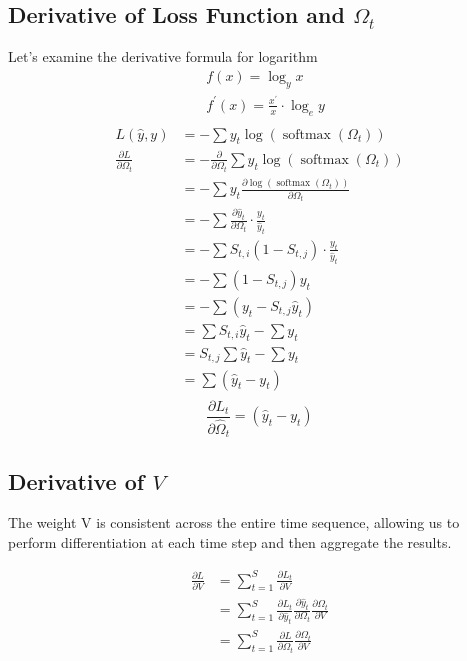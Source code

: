 \documentclass{article}
\begin{document}
\subsection{Derivative of Loss Function and $\Omega_t$}
Let's examine the derivative formula for logarithm
\begin{align*}
    & f(x)=\log _{y} x \\
& f^{\prime}(x)=\frac{x^{\prime}}{x} \cdot \log _{e} y\\
\end{align*}
\begin{align*}
    L(\hat{y}, y) &=-\sum y_{t} \log \left(\operatorname{softmax}\left(\Omega_{t}\right)\right)\\
    \frac{\partial L}{\partial \Omega_{t}} & =-\frac{\partial}{\partial \Omega_{t}} \sum y_{t} \log \left(\operatorname{softmax}\left(\Omega_{t}\right)\right) \\
&=-\sum y_{t} \frac{\partial \log \left(\operatorname{softmax}\left(\Omega_{t}\right)\right)}{\partial \Omega_{t}}  \\
& =-\sum \frac{\partial \hat{y}_t}{\partial \Omega_{t}} \cdot \frac{y_{t}}{\hat{y}_{t}} \\
& =-\sum S_{t,i}\left(1-S_{t,j}\right) \cdot \frac{y_{t}}{\hat{y}_{t}} \\
& =-\sum\left(1-S_{t,j}\right) y_{t} \\
& =-\sum\left(y_{t}-S_{t,j} \hat{y}_{t}\right) \\
& =\sum S_{t,i} \hat{y}_{t}-\sum y_{t} \\
& =S_{t,j} \sum \hat{y}_{t}-\sum y_{t} \\
& =\sum (\hat{y}_{t}-y_{t}) \\
\end{align*}
\begin{equation}
\label{eqn:partial_omega}
    \frac{\partial L_t}{\partial \hat{\Omega}_t} = (\hat{y}_{t}-y_{t})
\end{equation}
\subsection{Derivative of $V$}
The weight V is consistent across the entire time sequence, allowing us to perform differentiation at each time step and then aggregate the results. 

\begin{align*} 
\frac{\partial L}{\partial V} &= \sum_{t=1}^{S} \frac{\partial L_{t}}{\partial V} \\
&= \sum_{t=1}^{S} \frac{\partial L_{t}}{\partial \hat{y}_{t}} \frac{\partial \hat{y}_{t}}{\partial \Omega_{t}} \frac{\partial \Omega_{t}}{\partial V}\\
&= \sum_{t=1}^{S} \frac{\partial L}{\partial \Omega_t}  \frac{\partial \Omega_{t}}{\partial V}
\end{align*}
\end{document}
